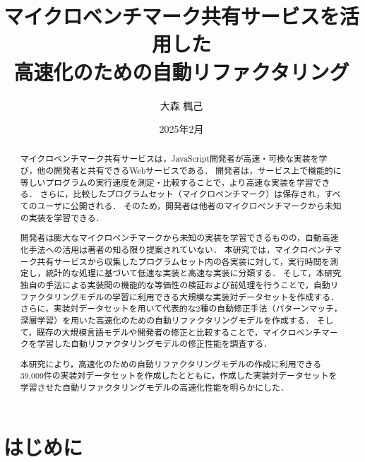 \documentclass[11pt]{jreport}
\title{マイクロベンチマーク共有サービスを活用した\\高速化のための自動リファクタリング}
\author{大森 楓己}
\date{2025年2月}
\begin{document}
\maketitle

\begin{abstract}
マイクロベンチマーク共有サービスは，JavaScript開発者が高速・可換な実装を学び，他の開発者と共有できるWebサービスである．
開発者は，サービス上で機能的に等しいプログラムの実行速度を測定・比較することで，より高速な実装を学習できる．
さらに，比較したプログラムセット（マイクロベンチマーク）は保存され，すべてのユーザに公開される．
そのため，開発者は他者のマイクロベンチマークから未知の実装を学習できる．

開発者は膨大なマイクロベンチマークから未知の実装を学習できるものの，自動高速化手法への活用は著者の知る限り提案されていない．
本研究では，マイクロベンチマーク共有サービスから収集したプログラムセット内の各実装に対して，実行時間を測定し，統計的な処理に基づいて低速な実装と高速な実装に分類する．
そして，本研究独自の手法による実装間の機能的な等価性の検証および前処理を行うことで，自動リファクタリングモデルの学習に利用できる大規模な実装対データセットを作成する．
さらに，実装対データセットを用いて代表的な2種の自動修正手法（パターンマッチ，深層学習）を用いた高速化のための自動リファクタリングモデルを作成する．
そして，既存の大規模言語モデルや開発者の修正と比較することで，マイクロベンチマークを学習した自動リファクタリングモデルの修正性能を調査する．

本研究により，高速化のための自動リファクタリングモデルの作成に利用できる39,009件の実装対データセットを作成したとともに，作成した実装対データセットを学習させた自動リファクタリングモデルの高速化性能を明らかにした．
\end{abstract}

\tableofcontents



\newpage
{}




\chapter{はじめに}\label{chapter:intro}
\end{document}
